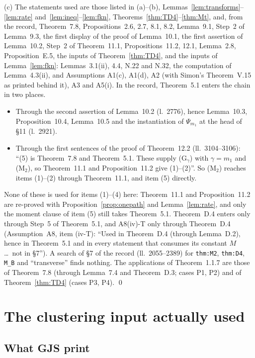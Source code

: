 \documentclass[11pt,a4paper]{article}
\theoremstyle{plain}
\theoremstyle{definition}
\begin{document}
(c) The statements used are those listed in (a)--(b), Lemmas~\ref{lem:transforms}--\ref{lem:rate}
and~\ref{lem:ineq}--\ref{lem:fkn}, Theorems~\ref{thm:TD4}--\ref{thm:Mt}, and, from the record,
Theorem~7.8, Propositions~2.6, 2.7, 8.1, 8.2, Lemma~9.1, Step~2 of Lemma~9.3, the first display
of the proof of Lemma~10.1, the first assertion of Lemma~10.2, Step~2 of Theorem~11.1,
Propositions~11.2, 12.1, Lemma~2.8, Proposition~E.5, the inputs of Theorem~\ref{thm:TD4}, and
the inputs of Lemma~\ref{lem:fkn}: Lemmas~3.1(ii), 4.4, N.22 and N.32, the computation of
Lemma~4.3(ii), and Assumptions A1(c), A1(d), A2 (with Simon's Theorem~V.15 as printed behind it),
A3 and A5(i).  In the record, Theorem~5.1 enters the chain in two places.
\begin{itemize}
\item Through the second assertion of Lemma~10.2 (l.~2776), hence Lemma~10.3,
Proposition~10.4, Lemma~10.5 and the instantiation of $\Psi_{m_1}$ at the head of \S11
(l.~2921).
\item Through the first sentences of the proof of Theorem~12.2 (ll.~3104--3106): ``(5) is
Theorem~7.8 and Theorem~5.1.  These supply (G$_\gamma$) with $\gamma=m_1$ and (M$_2$), so
Theorem~11.1 and Proposition~11.2 give (1)--(2)''.  So (M$_2$) reaches items (1)--(2) through
Theorem~11.1, and item (5) directly.
\end{itemize}
None of these is used for items (1)--(4) here: Theorem~11.1 and Proposition~11.2 are re-proved
with Proposition~\ref{prop:onepath} and Lemma~\ref{lem:rate}, and only the moment clause of
item (5) still takes Theorem~5.1.  Theorem~D.4 enters only through Step~5 of Theorem~5.1, and
A8(iv)-T only through Theorem~D.4 (Assumption~A8, item (iv-T): ``Used in Theorem~D.4 (through
Lemma~D.2), hence in Theorem~5.1 and in every statement that consumes its constant $M$ \dots\
not in \S7'').  A search of \S7 of the record (ll.~2055--2389) for \texttt{thm:M2},
\texttt{thm:D4}, \texttt{M\_B} and ``transverse'' finds nothing.  The applications of
Theorem~1.1.7 are those of Theorem~7.8 (through Lemma~7.4 and Theorem~D.3; cases P1, P2) and of
Theorem~\ref{thm:TD4} (cases P3, P4).  \qed

\section{The clustering input actually used}\label{sec:input}

\subsection{What GJS print}\label{sec:printed}
\end{document}
